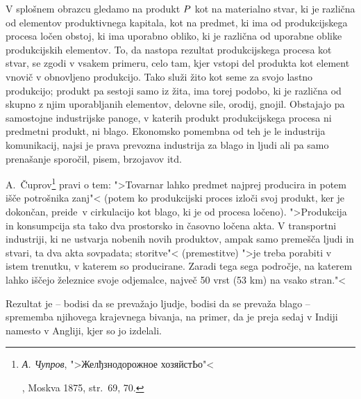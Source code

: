 \documentclass[kapital_02.tex]{subfiles}
\begin{document}
V splošnem obrazcu gledamo na produkt \(P\) kot na materialno stvar, ki je različna od elementov produktivnega kapitala, kot na predmet, ki ima od produkcijskega procesa ločen obstoj, ki ima uporabno obliko, ki je različna od uporabne oblike produkcijskih elementov. To, da nastopa rezultat produkcijskega procesa kot stvar, se zgodi v vsakem primeru, celo tam, kjer vstopi del produkta kot element vnovič v obnovljeno produkcijo. Tako služi žito kot seme za svojo lastno produkcijo; produkt pa sestoji samo iz žita, ima torej podobo, ki je različna od skupno z njim uporabljanih elementov, delovne sile, orodij, gnojil. Obstajajo pa samostojne industrijske panoge, v katerih produkt produkcijskega procesa ni predmetni produkt, ni blago. Ekonomsko pomembna od teh je le industrija komunikacij, najsi je prava prevozna industrija za blago in ljudi ali pa samo prenašanje sporočil, pisem, brzojavov itd.

A.~Čuprov\footnote{\begin{otherlanguage}{russian}\emph{А. Чупров}, ">Желђзнодорожное хозяйстЬо"<\end{otherlanguage}, Moskva 1875, str.\ 69, 70.} pravi o tem: ">Tovarnar lahko predmet najprej producira in potem išče potrošnika zanj"< (potem ko produkcijski proces izloči svoj produkt, ker je dokončan, preide\KPEstran\ v cirkulacijo kot blago, ki je od procesa ločeno). ">Produkcija in konsumpcija sta tako dva prostorsko in časovno ločena akta. V transportni industriji, ki ne ustvarja nobenih novih produktov, ampak samo premešča ljudi in stvari, ta dva akta sovpadata; storitve"< (premestitve) ">je treba porabiti v istem trenutku, v katerem so producirane. Zaradi tega sega področje, na katerem lahko iščejo železnice svoje odjemalce, največ 50 vrst (53 km) na vsako stran."<

Rezultat je -- bodisi da se prevažajo ljudje, bodisi da se prevaža blago -- sprememba njihovega krajevnega bivanja, na primer, da je preja sedaj v Indiji namesto v Angliji, kjer so jo izdelali.
\end{document}
